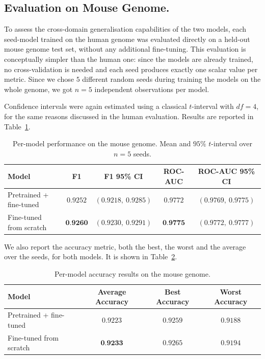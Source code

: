 \documentclass[11pt,a4paper,twoside]{article}
\begin{document}
\subsection{Evaluation on Mouse Genome.}
To assess the cross-domain generalisation capabilities of the two models, each seed-model trained on the human genome was evaluated directly on a held-out mouse genome test set, without any additional fine-tuning. This evaluation is conceptually simpler than the human one: since the models are already trained, no cross-validation is needed and each seed produces exactly one scalar value per metric. Since we chose $5$ different random seeds during training the models on the whole genome, we got $n = 5$ independent observations per model.

Confidence intervals were again estimated using a classical $t$-interval with $df = 4$, for the same reasons discussed in the human evaluation. Results are reported in Table~\ref{tab:mice_eval}.

\begin{table}[h]
	\centering
	\caption{Per-model performance on the mouse genome. Mean and $95\%$ 
		$t$-interval over $n = 5$ seeds. }
	\label{tab:mice_eval}
	\begin{tabular}{lcccc}
		\toprule
		\textbf{Model} & \textbf{F1} & \textbf{F1 95\% CI} & 
		\textbf{ROC-AUC} & \textbf{ROC-AUC 95\% CI} \\
		\midrule
		Pretrained + fine-tuned & $0.9252$ & $(0.9218,\ 0.9285)$ & 
		$0.9772$ & $(0.9769,\ 0.9775)$ \\
		Fine-tuned from scratch           & $\textbf{0.9260}$ & $(0.9230,\ 0.9291)$  & 
		$\textbf{0.9775}$ & $(0.9772,\ 0.9777)$  \\
		\bottomrule
	\end{tabular}
\end{table}

We also report the accuracy metric, both the best, the worst and the average over the seeds, for both models. It is shown in Table~\ref{tab:mice_eval_acc}.

\begin{table}[h]
	\centering
	\caption{Per-model accuracy results on the mouse genome.}
	\label{tab:mice_eval_acc}
	\begin{tabular}{lccc}
		\toprule
		\textbf{Model} & \textbf{Average Accuracy} & \textbf{Best Accuracy} & \textbf{Worst Accuracy} \\
		\midrule
		Pretrained + fine-tuned & $0.9223$ & $0.9259$ & $0.9188$ \\
		Fine-tuned from scratch & $\textbf{0.9233}$ & $0.9265$ & $0.9194$ \\
		\bottomrule
	\end{tabular}
\end{table}
\end{document}
